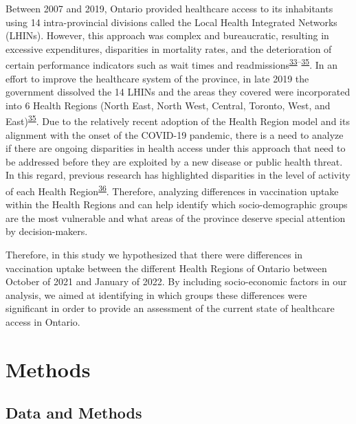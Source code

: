 \documentclass[
  letterpaper,
  DIV=11,
  numbers=noendperiod]{scrartcl}
\begin{document}
Between 2007 and 2019, Ontario provided healthcare access to its
inhabitants using 14 intra-provincial divisions called the Local Health
Integrated Networks (LHINs). However, this approach was complex and
bureaucratic, resulting in excessive expenditures, disparities in
mortality rates, and the deterioration of certain performance indicators
such as wait times and
readmissions\textsuperscript{\protect\hyperlink{ref-tsasis2012}{33}--\protect\hyperlink{ref-dong2022}{35}}.
In an effort to improve the healthcare system of the province, in late
2019 the government dissolved the 14 LHINs and the areas they covered
were incorporated into 6 Health Regions (North East, North West,
Central, Toronto, West, and
East)\textsuperscript{\protect\hyperlink{ref-dong2022}{35}}. Due to the
relatively recent adoption of the Health Region model and its alignment
with the onset of the COVID-19 pandemic, there is a need to analyze if
there are ongoing disparities in health access under this approach that
need to be addressed before they are exploited by a new disease or
public health threat. In this regard, previous research has highlighted
disparities in the level of activity of each Health
Region\textsuperscript{\protect\hyperlink{ref-sethuram2023}{36}}.
Therefore, analyzing differences in vaccination uptake within the Health
Regions and can help identify which socio-demographic groups are the
most vulnerable and what areas of the province deserve special attention
by decision-makers.

Therefore, in this study we hypothesized that there were differences in
vaccination uptake between the different Health Regions of Ontario
between October of 2021 and January of 2022. By including socio-economic
factors in our analysis, we aimed at identifying in which groups these
differences were significant in order to provide an assessment of the
current state of healthcare access in Ontario.

\hypertarget{methods}{%
\section{Methods}\label{methods}}

\hypertarget{sec-data}{%
\subsection{Data and Methods}\label{sec-data}}
\end{document}

